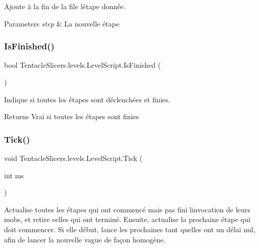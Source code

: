 Ajoute à la fin de la file l\textquotesingle{}étape donnée. 


\begin{DoxyParams}{Parameters}
{\em step} & La nouvelle étape \\
\hline
\end{DoxyParams}
\mbox{\label{class_tentacle_slicers_1_1levels_1_1_level_script_a7b9f11e8df73abbaedcb531aa8e4b1f7}} 
\subsubsection{\texorpdfstring{Is\+Finished()}{IsFinished()}}
{\footnotesize\ttfamily bool Tentacle\+Slicers.\+levels.\+Level\+Script.\+Is\+Finished (\begin{DoxyParamCaption}{ }\end{DoxyParamCaption})}



Indique si toutes les étapes sont déclenchées et finies. 

\begin{DoxyReturn}{Returns}
Vrai si toutes les étapes sont finies 
\end{DoxyReturn}
\mbox{\label{class_tentacle_slicers_1_1levels_1_1_level_script_a93a9edee66308c30511184e4328b30b5}} 
\subsubsection{\texorpdfstring{Tick()}{Tick()}}
{\footnotesize\ttfamily void Tentacle\+Slicers.\+levels.\+Level\+Script.\+Tick (\begin{DoxyParamCaption}\item[{int}]{ms }\end{DoxyParamCaption})}



Actualise toutes les étapes qui ont commencé mais pas fini l\textquotesingle{}invocation de leurs mobs, et retire celles qui ont terminé. Ensuite, actualise la prochaine étape qui doit commencer. Si elle début, lance les prochaines tant qu\textquotesingle{}elles ont un délai nul, afin de lancer la nouvelle vague de façon homogène. 


